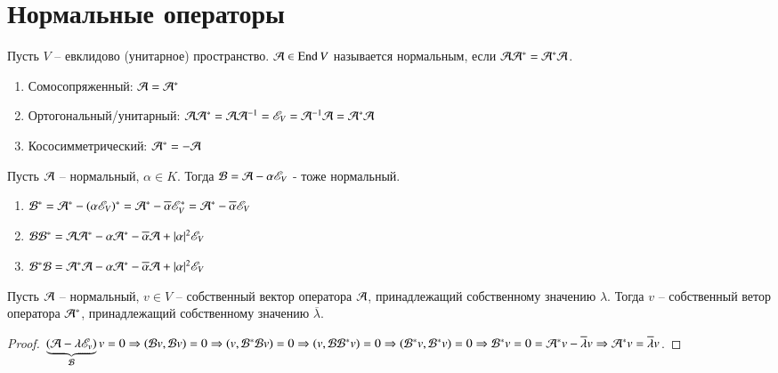 \documentclass[main]{subfiles}
\begin{document}
\chapter{Нормальные операторы}

\begin{definition}
    Пусть $V$ -- евклидово (унитарное) пространство. $\mathcal{A} \in \operatorname{End} V$ называется нормальным, если
    $\mathcal{A} \mathcal{A}^* = \mathcal{A}^* \mathcal{A}$.
    \begin{enumerate}
        \item Сомосопряженный: $\mathcal{A} = \mathcal{A}^*$
        \item Ортогональный/унитарный: $\mathcal{A} \mathcal{A}^* = \mathcal{A} \mathcal{A}^{-1} =\mathscr{E}_V = \mathcal{A}^{-1} \mathcal{A} = \mathcal{A}^* \mathcal{A}$
        \item Кососимметрический: $\mathcal{A}^* = -\mathcal{A}$
    \end{enumerate}
\end{definition}

\begin{proposition}
    Пусть $\mathcal{A}$ -- нормальный, $\alpha \in K$. Тогда $\mathcal{B} = \mathcal{A} - \alpha \mathscr{E}_V$ - тоже нормальный.
    \begin{enumerate}
        \item $\mathcal{B}^* = \mathcal{A}^* - (\alpha \mathscr{E}_V)^* = \mathcal{A}^* - \overline{\alpha}\mathscr{E}_V^* = \mathcal{A}^* - \overline{\alpha}\mathscr{E}_V$
        \item $\mathcal{B} \mathcal{B}^* = \mathcal{A} \mathcal{A}^* - \alpha\mathcal{A}^* - \overline{\alpha}\mathcal{A} + |\alpha|^2\mathscr{E}_V$
        \item $\mathcal{B}^* \mathcal{B} = \mathcal{A}^* \mathcal{A} - \alpha \mathcal{A}^* - \overline{\alpha}\mathcal{A} + |\alpha|^2\mathscr{E}_V$
    \end{enumerate}
\end{proposition}

\begin{proposition}
    Пусть $\mathcal{A}$ -- нормальный, $v \in V$ -- собственный вектор оператора $\mathcal{A}$, принадлежащий собственному значению $\lambda$. Тогда $v$ -- собственный ветор оператора $\mathcal{A}^*$, принадлежащий собственному значению $\overline{\lambda}$.
\end{proposition}

\begin{proof}
    $\underbrace{(\mathcal{A} - \lambda \mathscr{E}_v)}_{\mathcal{B}} v = 0 \Rightarrow (\mathcal{B} v, \mathcal{B} v) = 0 \Rightarrow
        (v, \mathcal{B}^* \mathcal{B} v) = 0 \Rightarrow (v, \mathcal{B} \mathcal{B}^* v) = 0 \Rightarrow (\mathcal{B}^* v, \mathcal{B}^* v) = 0 \Rightarrow \mathcal{B}^*v = 0 = \mathcal{A}^* v - \overline{\lambda}v \Rightarrow \mathcal{A}^*v = \overline{\lambda}v$.
\end{proof}
\end{document}
